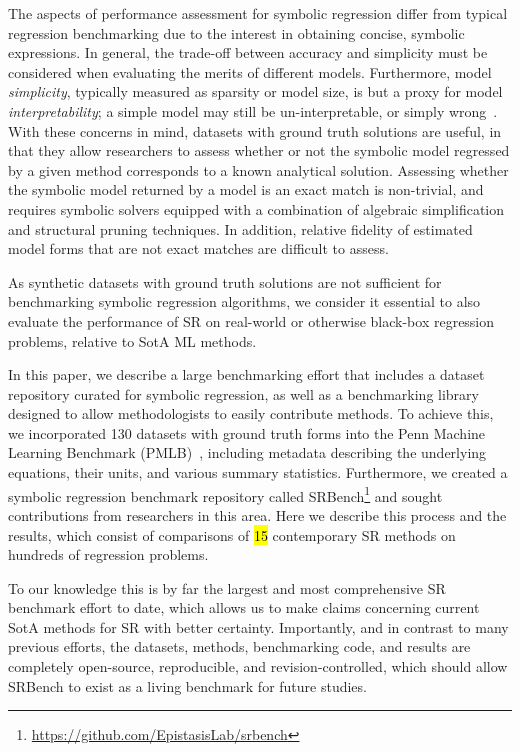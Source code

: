 The aspects of performance assessment for symbolic regression differ from typical regression benchmarking due to the interest in obtaining concise, symbolic expressions. 
In general, the trade-off between accuracy and simplicity must be considered when evaluating the merits of different models.  
Furthermore, model \emph{simplicity}, typically measured as sparsity or model size, is but a proxy for model \emph{interpretability}; a simple model may still be un-interpretable, or simply wrong~\cite{liptonMythos2018,poursabziManipulating2021,virgolinModelLearning2021}. 
With these concerns in mind, datasets with ground truth solutions are useful, in that they allow researchers to assess whether or not the symbolic model regressed by a given method corresponds to a known analytical solution. 
Assessing whether the symbolic model returned by a model is an exact match is non-trivial, and requires symbolic solvers equipped with a combination of algebraic simplification and structural pruning techniques.
In addition, relative fidelity of estimated model forms that are not exact matches are difficult to assess.

As synthetic datasets with ground truth solutions are not sufficient for benchmarking symbolic regression algorithms, we consider it essential to also evaluate the performance of SR on real-world or otherwise black-box regression problems, relative to SotA ML methods. 



In this paper, we describe a large benchmarking effort that includes a dataset repository curated for symbolic regression, as well as a benchmarking library designed to allow methodologists to easily contribute methods. 
To achieve this, we incorporated 130 datasets with ground truth forms into the Penn Machine Learning Benchmark (PMLB)~\cite{olsonPMLBLargeBenchmark2017d}, including metadata describing the underlying equations, their units, and various summary statistics. 
Furthermore, we created a symbolic regression benchmark repository called SRBench\footnote{\url{https://github.com/EpistasisLab/srbench}} and sought contributions from researchers in this area. 
Here we describe this process and the results, which consist of comparisons of \hl{15} contemporary SR methods on hundreds of regression problems. 

To our knowledge this is by far the largest and most comprehensive SR benchmark effort to date, which allows us to make claims concerning current SotA methods for SR with better certainty. 
Importantly, and in contrast to many previous efforts, the datasets, methods, benchmarking code, and results are completely open-source, reproducible, and revision-controlled, which should allow SRBench to exist as a living benchmark for future studies.

